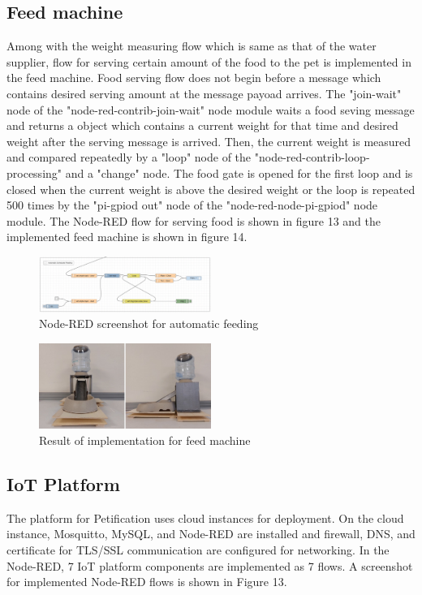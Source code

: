 \documentclass[conference]{IEEEtran}
\begin{document}
\subsection{Feed machine}
Among with the weight measuring flow which is same as that of the water supplier, flow for serving certain amount of the food to the pet is implemented in the feed machine. Food serving flow does not begin before a message which contains desired serving amount at the message payoad arrives. The "join-wait" node of the "node-red-contrib-join-wait" node module waits a food seving message and returns a object which contains a current weight for that time and desired weight after the serving message is arrived. Then, the current weight is measured and compared repeatedly by a "loop" node of the "node-red-contrib-loop-processing" and a "change" node. The food gate is opened for the first loop and is closed when the current weight is above the desired weight or the loop is repeated 500 times by the "pi-gpiod out" node of the "node-red-node-pi-gpiod" node module. The Node-RED flow for serving food is shown in figure 13 and the implemented feed machine is shown in figure 14.

\begin{figure}[htbp]
\centerline{\includegraphics[width=0.5\textwidth]{./images/automaticFeeding.png}}
\caption{Node-RED screenshot for automatic feeding}
\label{fig}
\end{figure}

\begin{figure}[htbp]
\centerline{\includegraphics[width=0.5\textwidth]{./images/feed-machine.jpg}}
\caption{Result of implementation for feed machine}
\label{fig}
\end{figure}

\subsection{IoT Platform}
The platform for Petification uses cloud instances for deployment. On the cloud instance, Mosquitto, MySQL, and Node-RED are installed and firewall, DNS, and certificate for TLS/SSL communication are configured for networking. In the Node-RED, 7 IoT platform components are implemented as 7 flows. A screenshot for implemented Node-RED flows is shown in Figure 13.
\end{document}
